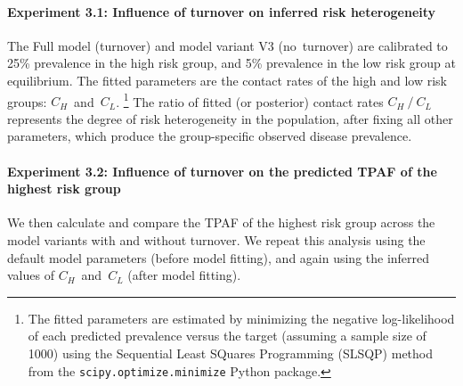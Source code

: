 \paragraph{Experiment 3.1: Influence of turnover on inferred risk heterogeneity}
The Full model (turnover) and model variant V3 (no~turnover) are calibrated to
25\% prevalence in the high risk group, and
5\% prevalence in the low risk group at equilibrium.
The fitted parameters are
the contact rates of the high and low risk groups: $C_H$~and~$C_L$.%
\footnote{The fitted parameters are estimated by minimizing
  the negative log-likelihood of each predicted prevalence versus the target
  (assuming a sample size of 1000)
  using the Sequential Least SQuares Programming (SLSQP) method~\citep{Kraft1988}
  from the \texttt{scipy.optimize.minimize} Python package.}
The ratio of fitted (or posterior) contact rates $C_H~/~C_L$
represents the degree of risk heterogeneity in the population, after fixing all other parameters,
which produce the group-specific observed disease prevalence.
\paragraph{Experiment 3.2: Influence of turnover on the predicted TPAF of the highest risk group}
We then calculate and compare the TPAF of the highest risk group
across the model variants with and without turnover.
We repeat this analysis using the default model parameters (before model fitting),
and again using the inferred values of $C_H$~and~$C_L$ (after model fitting).
